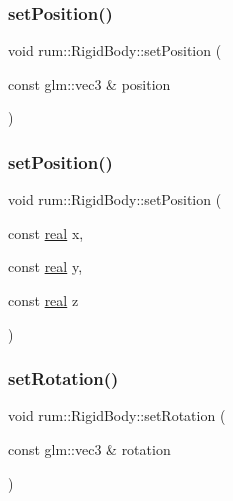 \subsubsection{\texorpdfstring{set\+Position()}{setPosition()}\hspace{0.1cm}{\footnotesize\ttfamily [1/2]}}
{\footnotesize\ttfamily void rum\+::\+Rigid\+Body\+::set\+Position (\begin{DoxyParamCaption}\item[{const glm\+::vec3 \&}]{position }\end{DoxyParamCaption})}

\mbox{\label{classrum_1_1_rigid_body_afc0f30fdfffeabbda5b59d96a571b9ac}} 
\subsubsection{\texorpdfstring{set\+Position()}{setPosition()}\hspace{0.1cm}{\footnotesize\ttfamily [2/2]}}
{\footnotesize\ttfamily void rum\+::\+Rigid\+Body\+::set\+Position (\begin{DoxyParamCaption}\item[{const \hyperlink{namespacerum_a7e8cca23573d5eaead0f138cbaa4862c}{real}}]{x,  }\item[{const \hyperlink{namespacerum_a7e8cca23573d5eaead0f138cbaa4862c}{real}}]{y,  }\item[{const \hyperlink{namespacerum_a7e8cca23573d5eaead0f138cbaa4862c}{real}}]{z }\end{DoxyParamCaption})}

\mbox{\label{classrum_1_1_rigid_body_aa6b6e73db8fefb0a54d82cf245b6bda6}} 
\subsubsection{\texorpdfstring{set\+Rotation()}{setRotation()}\hspace{0.1cm}{\footnotesize\ttfamily [1/2]}}
{\footnotesize\ttfamily void rum\+::\+Rigid\+Body\+::set\+Rotation (\begin{DoxyParamCaption}\item[{const glm\+::vec3 \&}]{rotation }\end{DoxyParamCaption})}

